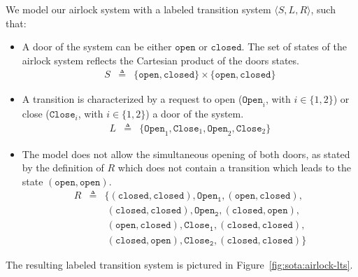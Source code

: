 \begin{example}
  \label{example:sota:airlocklts}

  We model our airlock system with a labeled transition system
  \( \langle S, L, R \rangle \), such that:

  \begin{itemize}
  \item A door of the system can be either \( \mathtt{open} \) or
    \( \mathtt{closed} \).
    The set of states of the airlock system reflects the Cartesian product of
    the doors states.
    \[
      \begin{array}{rcl}
        S & \triangleq & \{ \mathtt{open}, \mathtt{closed} \} \times \{ \mathtt{open},
                         \mathtt{closed} \}
      \end{array}
    \]
  \item A transition is characterized by a request to open
    (\( \mathtt{Open}_i\), with \( i \in \{1, 2\} \)) or close
    (\( \mathtt{Close}_i \), with \( i \in \{1, 2\} \)) a door of the system.
    \[
      \begin{array}{rcl}
        L & \triangleq & \{ \mathtt{Open}_1, \mathtt{Close}_1, \mathtt{Open}_2,
                         \mathtt{Close}_2 \}
      \end{array}
    \]
  \item The model does not allow the simultaneous opening of both doors, as
    stated by the definition of \( R \) which does not contain a transition
    which leads to the state \( (\mathtt{open}, \mathtt{open}) \).
    \[
      \begin{array}{rcl}
        R & \triangleq & \{ (\mathtt{closed}, \mathtt{closed}), \mathtt{Open_1},
                         (\mathtt{open}, \mathtt{closed}), \\
          & & \ (\mathtt{closed}, \mathtt{closed}), \mathtt{Open_2},
              (\mathtt{closed}, \mathtt{open}), \\
          & & \ (\mathtt{open}, \mathtt{closed}), \mathtt{Close_1},
              (\mathtt{closed}, \mathtt{closed}), \\
          & & \ (\mathtt{closed}, \mathtt{open}), \mathtt{Close_2},
              (\mathtt{closed}, \mathtt{closed}) \}
      \end{array}
    \]
  \end{itemize}

  The resulting labeled transition system is pictured in
  Figure~\ref{fig:sota:airlock-lts}.
\end{example}

